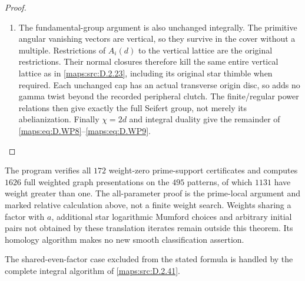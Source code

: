 \begin{proof}
\begin{enumerate}[label=\arabic*.,leftmargin=*]
\item The fundamental-group argument is also unchanged
integrally. The primitive angular vanishing
vectors are vertical, so they survive in the
cover without a multiple. Restrictions of
$A_i(d)$ to the vertical lattice are the
original restrictions. Their normal closures
therefore kill the same entire vertical
lattice as in \ref{maps:src:D.2.23}, including its original
star thimble when required. Each unchanged
cap has an actual transverse origin disc, so
adds no gamma twist beyond the recorded
peripheral clutch. The finite/regular power
relations then give exactly the full Seifert
group, not merely its abelianization.
Finally $\chi=2d$ and integral duality give
the remainder of \eqref{maps:eq:D.WP8}--\eqref{maps:eq:D.WP9}.
\end{enumerate}
\end{proof}

The program verifies all $172$ weight-zero
prime-support certificates and computes $1626$
full weighted graph presentations on the $495$
patterns, of which $1131$ have weight greater
than one. The all-parameter proof is the
prime-local argument and marked relative
calculation above, not a finite weight search.
Weights sharing a factor with $a$, additional
star logarithmic Mumford choices and arbitrary
initial pairs not obtained by these translation
iterates remain outside this theorem. Its
homology algorithm makes no new smooth
classification assertion.

The shared-even-factor case excluded from the stated formula is handled by the complete integral algorithm of \ref{maps:src:D.2.41}.

